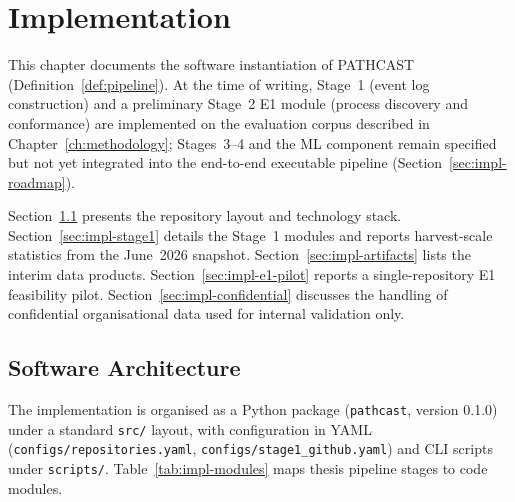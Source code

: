 
\chapter{Implementation}
\label{ch:implementation}

This chapter documents the software instantiation of PATHCAST
(Definition~\ref{def:pipeline}). At the time of writing, Stage~1 (event log
construction) and a preliminary Stage~2 E1 module (process discovery and
conformance) are implemented on the evaluation corpus described in
Chapter~\ref{ch:methodology}; Stages~3--4 and the ML component remain
specified but not yet integrated into the end-to-end executable pipeline
(Section~\ref{sec:impl-roadmap}).

Section~\ref{sec:impl-architecture} presents the repository layout and
technology stack. Section~\ref{sec:impl-stage1} details the Stage~1 modules
and reports harvest-scale statistics from the June~2026 snapshot.
Section~\ref{sec:impl-artifacts} lists the interim data products.
Section~\ref{sec:impl-e1-pilot} reports a single-repository E1 feasibility
pilot. Section~\ref{sec:impl-confidential} discusses the handling of
confidential organisational data used for internal validation only.


\section{Software Architecture}
\label{sec:impl-architecture}

The implementation is organised as a Python package (\texttt{pathcast}, version
0.1.0) under a standard \texttt{src/} layout, with configuration in YAML
(\texttt{configs/repositories.yaml}, \texttt{configs/stage1\_github.yaml}) and
CLI scripts under \texttt{scripts/}. Table~\ref{tab:impl-modules} maps thesis
pipeline stages to code modules.

